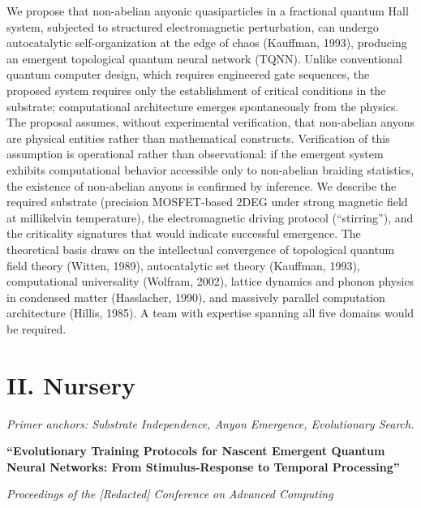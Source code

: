 We propose that non-abelian anyonic quasiparticles in a fractional quantum Hall system, subjected to structured electromagnetic perturbation, %
can undergo autocatalytic self-organization at the edge of chaos (Kauffman, 1993), producing an emergent topological quantum neural network (TQNN). Unlike conventional quantum computer design, which requires engineered gate sequences, the proposed system requires only the establishment of critical conditions in the substrate; computational architecture emerges spontaneously from the physics. The proposal assumes, without experimental verification, that non-abelian anyons are physical entities rather than mathematical constructs. Verification of this assumption is operational rather than observational: if the emergent system exhibits computational behavior accessible only to non-abelian braiding statistics, the existence of non-abelian anyons is confirmed by inference. We describe the required substrate (precision MOSFET-based 2DEG under strong magnetic field at millikelvin temperature), the electromagnetic driving protocol (``stirring''), and the criticality signatures that would indicate successful emergence. The theoretical basis draws on the intellectual convergence of topological quantum field theory (Witten, 1989), autocatalytic set theory (Kauffman, 1993), computational universality (Wolfram, 2002), lattice dynamics and phonon physics in condensed matter (Hasslacher, 1990), and massively parallel computation architecture (Hillis, 1985). A team with expertise spanning all five domains would be required.

\vspace{1cm}

\section*{II. Nursery}
\label{appendix:nursery}

\noindent\textit{Primer anchors: Substrate Independence, Anyon Emergence, Evolutionary Search.}

\textbf{``Evolutionary Training Protocols for Nascent Emergent Quantum Neural Networks: From Stimulus-Response to Temporal Processing''}

\textit{Proceedings of the [Redacted] Conference on Advanced Computing}

